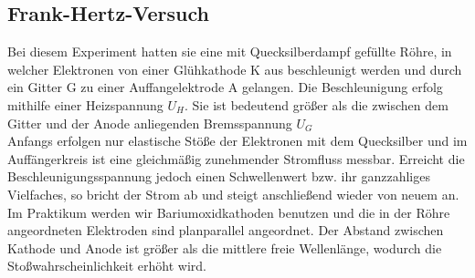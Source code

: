 \documentclass{article}
\begin{document}
{{\begin{center}
\begin{minipage}{\linewidth}
\centering
{}
%
\label{wtd}
\end{minipage}
\end{center}

\subsection{Frank-Hertz-Versuch}
{\begin{center}
\begin{minipage}{\linewidth}
\centering
{}
%
\label{wtd}
\end{minipage}
\end{center}
Bei diesem Experiment hatten sie eine mit Quecksilberdampf gefüllte Röhre, in welcher Elektronen von einer Glühkathode K aus beschleunigt werden und durch ein Gitter G zu einer Auffangelektrode A gelangen. Die Beschleunigung erfolg mithilfe einer Heizspannung \(U_H\). Sie ist bedeutend größer als die zwischen dem Gitter und der Anode anliegenden Bremsspannung \(U_G\)\\
Anfangs erfolgen nur elastische Stöße der Elektronen mit dem Quecksilber und im Auffängerkreis ist eine gleichmäßig zunehmender Stromfluss messbar. Erreicht die Beschleunigungsspannung jedoch einen Schwellenwert bzw. ihr ganzzahliges Vielfaches, so bricht der Strom ab und steigt anschließend wieder von neuem an.\\
Im Praktikum werden wir Bariumoxidkathoden benutzen und die in der Röhre angeordneten Elektroden sind planparallel angeordnet. Der Abstand zwischen Kathode und Anode ist größer als die mittlere freie Wellenlänge, wodurch die Stoßwahrscheinlichkeit erhöht wird.

}}}
\end{document}
